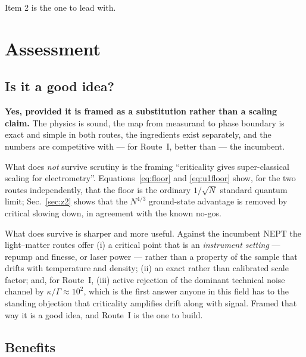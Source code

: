 \documentclass[11pt,a4paper]{article}
\begin{document}
Item 2 is the one to lead with.

\section{Assessment}
\label{sec:verdict}

\subsection{Is it a good idea?}

\textbf{Yes, provided it is framed as a substitution rather than a scaling claim.} The
physics is sound, the map from measurand to phase boundary is exact and simple in both routes,
the ingredients exist separately, and the numbers are competitive with --- for Route~I,
better than --- the incumbent.

What does \emph{not} survive scrutiny is the framing ``criticality gives super-classical
scaling for electrometry''. Equations~\eqref{eq:floor} and \eqref{eq:u1floor} show, for the two
routes independently, that the floor is the ordinary $1/\sqrt N$ standard quantum limit;
Sec.~\ref{sec:z2} shows that the $N^{4/3}$ ground-state advantage is removed by critical
slowing down, in agreement with the known no-gos.

What does survive is sharper and more useful. Against the incumbent NEPT the light--matter
routes offer (i) a critical point that is an \emph{instrument setting} --- repump and finesse,
or laser power --- rather than a property of the sample that drifts with temperature and
density; (ii) an exact rather than calibrated scale factor; and, for Route~I, (iii) active
rejection of the dominant technical noise channel by $\kappa/\Gamma\approx10^2$, which is the
first answer anyone in this field has to the standing objection that criticality amplifies
drift along with signal. Framed that way it is a good idea, and Route~I is the one to build.

\subsection{Benefits}
\end{document}
